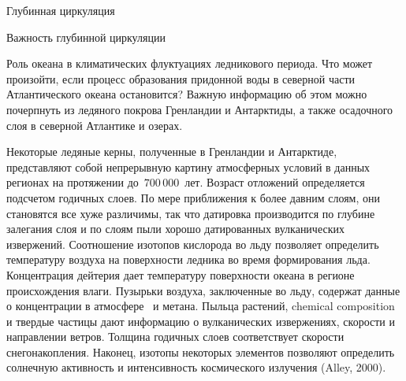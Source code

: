 \begin{chapter}{Глубинная циркуляция}
\begin{section}{Важность глубинной циркуляции}
\begin{paragraph}{Роль океана в климатических флуктуациях ледникового периода.}
Что может произойти, если процесс образования
придонной воды в северной части Атлантического океана остановится? 
Важную информацию об этом можно почерпнуть из ледяного покрова Гренландии
и Антарктиды, а также осадочного слоя в северной Атлантике и озерах.
%

Некоторые ледяные керны, полученные в Гренландии и Антарктиде, представляют
собой непрерывную картину атмосферных 
условий в данных регионах на протяжении
до~$700\,000$~лет. Возраст отложений определяется подсчетом годичных слоев.
По мере приближения к более давним слоям, они становятся все хуже различимы,
так что датировка производится по глубине залегания слоя и по слоям пыли
хорошо датированных вулканических извержений. Соотношение изотопов кислорода
во льду позволяет определить температуру воздуха на поверхности ледника во
время формирования льда. Концентрация дейтерия дает температуру поверхности
океана в регионе происхождения влаги. Пузырьки воздуха, заключенные во льду,
содержат данные о концентрации в атмосфере~\COtwo{} и метана.
Пыльца растений, chemical composition и твердые частицы дают информацию 
о вулканических извержениях, скорости и направлении ветров. 
Толщина годичных слоев соответствует скорости снегонакопления. 
Наконец, изотопы некоторых элементов позволяют определить
солнечную активность и интенсивность космического излучения (Alley, 2000).
%


\end{paragraph}
\end{section}
\end{chapter}

